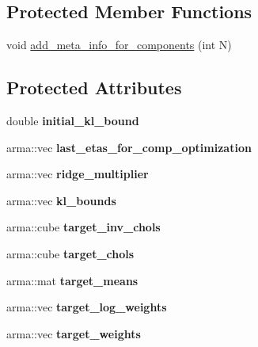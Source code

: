 \subsection*{Protected Member Functions}
\begin{DoxyCompactItemize}
\item 
void \hyperlink{classVIPS__Model_ad175bd3a39cec843b674a9d937c01654}{add\+\_\+meta\+\_\+info\+\_\+for\+\_\+components} (int N)
\end{DoxyCompactItemize}
\subsection*{Protected Attributes}
\begin{DoxyCompactItemize}
\item 
double {\bfseries initial\+\_\+kl\+\_\+bound}\hypertarget{classVIPS__Model_a9814472714c00939b479ddab4ed00fb2}{}\label{classVIPS__Model_a9814472714c00939b479ddab4ed00fb2}

\item 
arma\+::vec {\bfseries last\+\_\+etas\+\_\+for\+\_\+comp\+\_\+optimization}\hypertarget{classVIPS__Model_a0b2633c15ce1dee47eb88e1fba20de0c}{}\label{classVIPS__Model_a0b2633c15ce1dee47eb88e1fba20de0c}

\item 
arma\+::vec {\bfseries ridge\+\_\+multiplier}\hypertarget{classVIPS__Model_a15e0485d0b2d20cebe4aca4d106ac788}{}\label{classVIPS__Model_a15e0485d0b2d20cebe4aca4d106ac788}

\item 
arma\+::vec {\bfseries kl\+\_\+bounds}\hypertarget{classVIPS__Model_a0f298d2e9f9c0ea430c9785812dee158}{}\label{classVIPS__Model_a0f298d2e9f9c0ea430c9785812dee158}

\item 
arma\+::cube {\bfseries target\+\_\+inv\+\_\+chols}\hypertarget{classVIPS__Model_ac181de1cbdb425e501b43d61162577e0}{}\label{classVIPS__Model_ac181de1cbdb425e501b43d61162577e0}

\item 
arma\+::cube {\bfseries target\+\_\+chols}\hypertarget{classVIPS__Model_a79230bd91c1c0f986deb5357883ed2c0}{}\label{classVIPS__Model_a79230bd91c1c0f986deb5357883ed2c0}

\item 
arma\+::mat {\bfseries target\+\_\+means}\hypertarget{classVIPS__Model_a01e37d2f3d74b66b5f7e28c25e0f1b4c}{}\label{classVIPS__Model_a01e37d2f3d74b66b5f7e28c25e0f1b4c}

\item 
arma\+::vec {\bfseries target\+\_\+log\+\_\+weights}\hypertarget{classVIPS__Model_a6b16122ed1ffd5e18adb0e96bc1fd58b}{}\label{classVIPS__Model_a6b16122ed1ffd5e18adb0e96bc1fd58b}

\item 
arma\+::vec {\bfseries target\+\_\+weights}\hypertarget{classVIPS__Model_adce427fb02e181c2a90bb2b095f6edaf}{}\label{classVIPS__Model_adce427fb02e181c2a90bb2b095f6edaf}

\end{DoxyCompactItemize}


